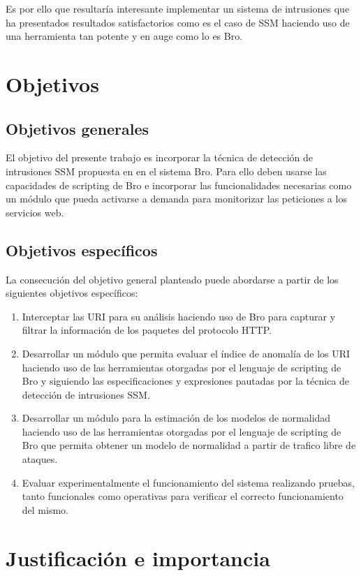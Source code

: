Es por ello que resultaría interesante implementar un sistema de intrusiones que ha presentados resultados satisfactorios como es el caso de SSM haciendo uso de una herramienta tan potente y en auge como lo es Bro.

\section*{Objetivos}
\subsection*{Objetivos generales}
El objetivo del presente trabajo es incorporar la técnica de detección de intrusiones SSM propuesta en \cite{ssm} en el sistema Bro. Para ello deben usarse las capacidades de scripting de Bro e incorporar las funcionalidades necesarias como un módulo que pueda activarse a demanda para monitorizar las peticiones a los servicios web.
\subsection*{Objetivos específicos}
La consecución del objetivo general planteado puede abordarse a partir de los siguientes objetivos específicos:

\begin{enumerate}
\item Interceptar las URI para su análisis haciendo uso de Bro para capturar y filtrar la información de los paquetes del protocolo HTTP.
\item Desarrollar un módulo que permita evaluar el índice de anomalía de los URI haciendo uso de las herramientas otorgadas por el lenguaje de scripting de Bro y siguiendo las especificaciones y expresiones pautadas por la técnica de detección de intrusiones SSM. 
\item Desarrollar un módulo para la estimación de los modelos de normalidad haciendo uso de las herramientas otorgadas por el lenguaje de scripting de Bro que permita obtener un modelo de normalidad a partir de trafico libre de ataques.
\item Evaluar experimentalmente el funcionamiento del sistema realizando pruebas, tanto funcionales como operativas para verificar el correcto funcionamiento del mismo.
\end{enumerate}

\section*{Justificación e importancia}


